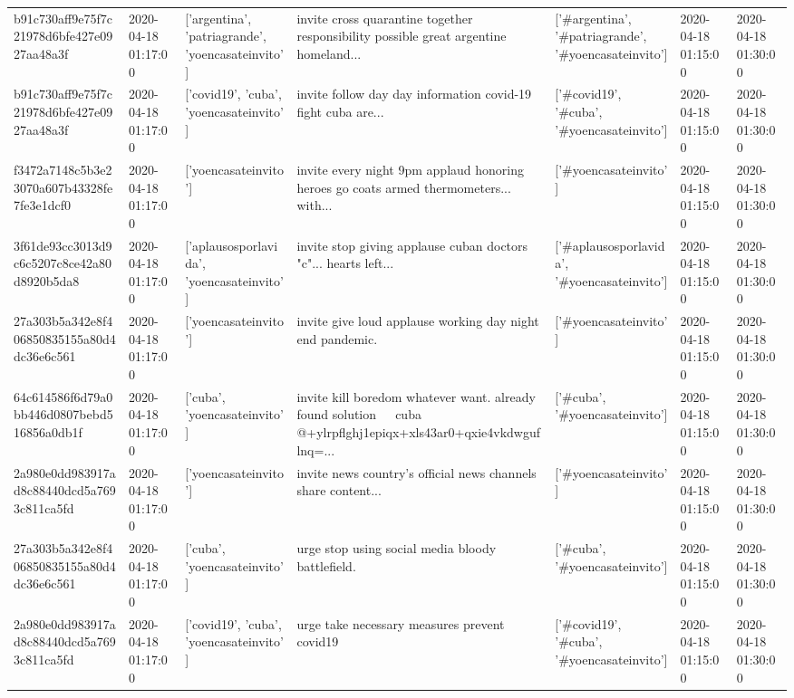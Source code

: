 \begin{tabular}{lllllll}
b91c730aff9e75f7c21978d6bfe427e0927aa48a3f & 2020-04-18 01:17:00 & ['argentina', 'patriagrande', 'yoencasateinvito'] & invite cross quarantine together responsibility possible great argentine homeland... & ['#argentina', '#patriagrande', '#yoencasateinvito'] & 2020-04-18 01:15:00 & 2020-04-18 01:30:00 \\
b91c730aff9e75f7c21978d6bfe427e0927aa48a3f & 2020-04-18 01:17:00 & ['covid19', 'cuba', 'yoencasateinvito'] & invite follow day day information covid-19 fight cuba are... & ['#covid19', '#cuba', '#yoencasateinvito'] & 2020-04-18 01:15:00 & 2020-04-18 01:30:00 \\
f3472a7148c5b3e23070a607b43328fe7fe3e1dcf0 & 2020-04-18 01:17:00 & ['yoencasateinvito'] & invite every night 9pm applaud honoring heroes go coats armed thermometers... with... & ['#yoencasateinvito'] & 2020-04-18 01:15:00 & 2020-04-18 01:30:00 \\
3f61de93cc3013d9c6c5207c8ce42a80d8920b5da8 & 2020-04-18 01:17:00 & ['aplausosporlavida', 'yoencasateinvito'] & invite stop giving applause cuban doctors "c"... hearts left... & ['#aplausosporlavida', '#yoencasateinvito'] & 2020-04-18 01:15:00 & 2020-04-18 01:30:00 \\
27a303b5a342e8f406850835155a80d4dc36e6c561 & 2020-04-18 01:17:00 & ['yoencasateinvito'] & invite give loud applause working day night end pandemic. & ['#yoencasateinvito'] & 2020-04-18 01:15:00 & 2020-04-18 01:30:00 \\
64c614586f6d79a0bb446d0807bebd516856a0db1f & 2020-04-18 01:17:00 & ['cuba', 'yoencasateinvito'] & invite kill boredom whatever want. already found solution 🤣🤣🤣 cuba @+ylrpflghj1epiqx+xls43ar0+qxie4vkdwguflnq=... & ['#cuba', '#yoencasateinvito'] & 2020-04-18 01:15:00 & 2020-04-18 01:30:00 \\
2a980e0dd983917ad8c88440dcd5a7693c811ca5fd & 2020-04-18 01:17:00 & ['yoencasateinvito'] & invite news country's official news channels share content... & ['#yoencasateinvito'] & 2020-04-18 01:15:00 & 2020-04-18 01:30:00 \\
27a303b5a342e8f406850835155a80d4dc36e6c561 & 2020-04-18 01:17:00 & ['cuba', 'yoencasateinvito'] & urge stop using social media bloody battlefield. & ['#cuba', '#yoencasateinvito'] & 2020-04-18 01:15:00 & 2020-04-18 01:30:00 \\
2a980e0dd983917ad8c88440dcd5a7693c811ca5fd & 2020-04-18 01:17:00 & ['covid19', 'cuba', 'yoencasateinvito'] & urge take necessary measures prevent covid19 & ['#covid19', '#cuba', '#yoencasateinvito'] & 2020-04-18 01:15:00 & 2020-04-18 01:30:00 \\

\end{tabular}
